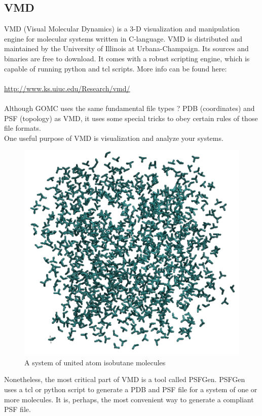 \subsection{VMD}
VMD (Visual Molecular Dynamics) is a 3-D visualization and manipulation engine for molecular systems written in C-language. VMD is distributed and maintained by the University of Illinois at Urbana-Champaign.  Its sources and binaries are free to download. It comes with a robust scripting engine, which is capable of running python and tcl scripts.
More info can be found here:\\\\
\url{http://www.ks.uiuc.edu/Research/vmd/}\\\\
Although GOMC uses the same fundamental file types ? PDB (coordinates) and PSF (topology) as VMD, it uses some special tricks to obey certain rules of those file formats.\\
One useful purpose of VMD is visualization and analyze your systems.
\begin{figure}[H]
\centering
\includegraphics[scale=0.6]{images/vmd}
\caption{A system of united atom isobutane molecules}
\end{figure}
Nonetheless, the most critical part of VMD is a tool called PSFGen.  PSFGen uses a tcl or python script to generate a PDB and PSF file for a system of one or more molecules.  It is, perhaps, the most convenient way to generate a compliant PSF file.
